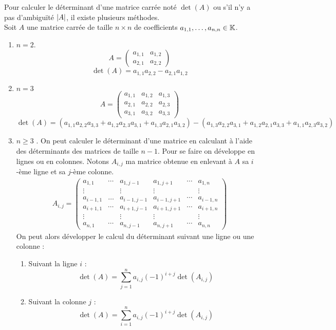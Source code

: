 Pour calculer le déterminant d'une matrice carrée noté $\det(A)$ ou s'il n'y a pas d'ambiguïté $\abs{A}$, il existe plusieurs méthodes.
\\
Soit $A$ une matrice carrée de taille $n \times n$ de coefficients $a_{1,1},\ldots,a_{n,n} \in \mathbb{K}$. 
\begin{enumerate}
    \item $n = 2$. 
    \[ 
    A = 
    \begin{pmatrix}
        a_{1,1} & a_{1,2} \\
        a_{2,1} & a_{2,2}
    \end{pmatrix}
    \]
    \[ \det(A) = a_{1,1} a_{2,2} - a_{2,1} a_{1,2} \]
    \item $n = 3$
    \[
    A = 
    \begin{pmatrix}
        a_{1,1} & a_{1,2} & a_{1,3} \\
        a_{2,1} & a_{2,2} & a_{2,3} \\
        a_{3,1} & a_{3,2} & a_{3,3}
    \end{pmatrix}
    \]
    \[ \det(A) = (a_{1,1} a_{2,2} a_{3,3} + a_{1,2} a_{2,3} a_{3,1} + a_{1,3} a_{2,1} a_{3,2} ) - (a_{1,3} a_{2,2} a_{3,1} + a_{1,2} a_{2,1} a_{3,3} + a_{1,1} a_{2,3} a_{3,2}) \]
    \item $n \geq 3$ \cite{wikipedia_determinant}.
    On peut calculer le déterminant d'une matrice en calculant à l'aide des déterminants des matrices de taille $n-1$. Pour se faire on développe en lignes ou en colonnes.
    Notons $A_{i,j}$ ma matrice obtenue en enlevant à $A$ sa $i$-ème ligne et sa $j$-ème colonne.
    \begin{align*}
       	A_{i,j} = 
       	\begin{pmatrix}
       		a_{1,1} & \cdots & a_{1, j-1} & a_{1, j+1} & \cdots & a_{1,n} \\
       		\vdots & & \vdots & \vdots & & \vdots \\
       		a_{i-1, 1} & \ldots & a_{i-1, j-1} & a_{i-1, j+1} & \cdots & a_{i-1,n} \\
       		a_{i+1, 1} & \cdots & a_{i+1, j-1} & a_{i+1, j+1} & \cdots & a_{i+1, n} \\
       		\vdots & & \vdots & \vdots & & \vdots \\
       		a_{n,1} & \cdots & a_{n,j-1} & a_{n,j+1} & \cdots & a_{n,n}
       	\end{pmatrix}
    \end{align*}
    On peut alors développer le calcul du déterminant  suivant une ligne ou une colonne : 
    \begin{enumerate}
       	\item Suivant la ligne $i$ : 
       	\[ \det(A) = \sum_{j=1}^n a_{i,j} (-1)^{i+j} \det(A_{i,j}) \]
       	\item Suivant la colonne $j$ : 
       	\[ \det(A) = \sum_{i=1}^n a_{i,j} (-1)^{i+j} \det(A_{i,j}) \]
    \end{enumerate}
\end{enumerate}

